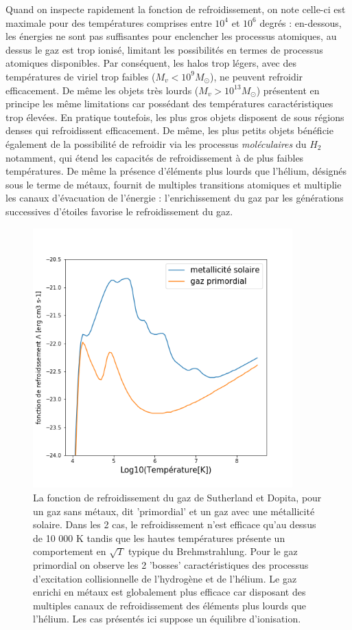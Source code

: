 Quand on inspecte rapidement la fonction de refroidissement, on note celle-ci est maximale pour des températures comprises entre $10^4$ et $10^6$ degrés : en-dessous, les énergies ne sont pas suffisantes pour enclencher les processus atomiques, au dessus le gaz est trop ionisé, limitant les possibilités en termes de processus atomiques disponibles. Par conséquent, les halos trop légers, avec des températures de viriel trop faibles ($M_v<10^9 M_\odot$), ne peuvent refroidir efficacement. De même les objets très lourds ($M_v>10^{13} M_\odot$) présentent en principe les même limitations car possédant des températures caractéristiques trop élevées. En pratique toutefois, les plus gros objets disposent de sous régions denses qui refroidissent efficacement. De même, les plus petits objets bénéficie également de la possibilité de refroidir via les processus \textit{moléculaires} du $H_2$ notamment, qui étend les capacités de refroidissement à de plus faibles températures. De même la présence d'éléments plus lourds que l'hélium, désignés sous le terme de métaux, fournit de multiples transitions atomiques et multiplie les canaux d'évacuation de l'énergie : l'enrichissement du gaz par les générations successives d'étoiles favorise le refroidissement du gaz.

\begin{figure}[htbp]
	\centering
		\includegraphics[height=10cm]{figs/cool.png}
		\caption[La fonction de refroidissement du gaz]{La fonction de refroidissement du gaz de Sutherland et Dopita, pour un gaz sans métaux, dit 'primordial' et un gaz avec une métallicité solaire. Dans les 2 cas, le refroidissement n'est efficace qu'au dessus de 10 000 K tandis que les hautes températures présente un comportement en $\sqrt{T}$ typique du Brehmstrahlung. Pour le gaz primordial on observe les 2 'bosses' caractéristiques des processus d'excitation collisionnelle de l'hydrogène et de l'hélium. Le gaz enrichi en métaux est globalement plus efficace car disposant des multiples canaux de refroidissement des éléments plus lourds que l'hélium. Les cas présentés ici suppose un équilibre d'ionisation.}
	\label{f:cool}
\end{figure}



